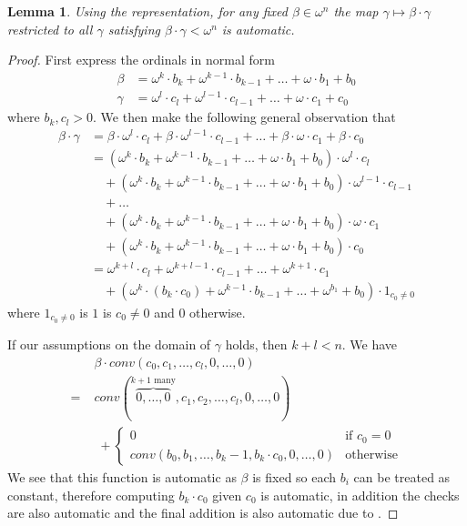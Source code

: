 \documentclass[british,a4paper,11pt,abstract=on]{scrreprt}
\newtheorem{lemma}[theorem]{Lemma}
\theoremstyle{definition}
\theoremstyle{remark}
\begin{document}
\begin{lemma}
    Using the representation, for any fixed \(\beta\in\omega^n\) the map \(\gamma \mapsto \beta\cdot\gamma\)
    restricted to all \(\gamma\) satisfying \(\beta\cdot\gamma < \omega^n\) is automatic.
\end{lemma}
\begin{proof}
    First express the ordinals in normal form
    \begin{align*}
        \beta  &= \omega^k\cdot b_k + \omega^{k-1}\cdot b_{k-1} + \dots + \omega\cdot b_1 + b_0 \\
        \gamma &= \omega^l\cdot c_l + \omega^{l-1}\cdot c_{l-1} + \dots + \omega\cdot c_1 + c_0
    \end{align*}
    where \(b_k, c_l > 0\). We then make the following general observation that
    \begin{align*}
        \beta\cdot\gamma &= \beta\cdot\omega^l\cdot c_l + \beta\cdot\omega^{l-1}\cdot c_{l-1} + \dots + \beta\cdot\omega\cdot c_1 + \beta\cdot c_0 \\
        &= \left( \omega^k\cdot b_k + \omega^{k-1}\cdot b_{k-1} + \dots + \omega\cdot b_1 + b_0 \right)\cdot\omega^l\cdot c_l \\
        &\quad + \left( \omega^k\cdot b_k + \omega^{k-1}\cdot b_{k-1} + \dots + \omega\cdot b_1 + b_0 \right)\cdot\omega^{l-1}\cdot c_{l-1} \\
        &\quad + \dots\\
        &\quad + \left( \omega^k\cdot b_k + \omega^{k-1}\cdot b_{k-1} + \dots + \omega\cdot b_1 + b_0 \right)\cdot\omega\cdot c_1 \\
        &\quad + \left( \omega^k\cdot b_k + \omega^{k-1}\cdot b_{k-1} + \dots + \omega\cdot b_1 + b_0 \right)\cdot c_0 \\
        &= \omega^{k+l}\cdot c_l + \omega^{k+l-1}\cdot c_{l-1} + \dots + \omega^{k+1}\cdot c_1 \\
        &\quad + \left(\omega^k\cdot (b_k\cdot c_0) + \omega^{k-1}\cdot b_{k-1} + \dots + \omega^{b_1} + b_0\right)\cdot 1_{c_0 \ne 0}
    \end{align*}
    where \(1_{c_0 \ne 0}\) is \(1\) is \(c_0 \ne 0\) and \(0\) otherwise.

    If our assumptions on the domain of \(\gamma\) holds, then \(k+l < n\). We have
    \begin{align*}
         &\beta\cdot conv(c_0,c_1,\dots,c_l,0,\dots,0) \\
        =\; &conv(\overbrace{0,\dots,0}^{k+1\text{ many}}, c_1, c_2, \dots, c_l, 0, \dots, 0) \\
        &\; + \begin{cases}
            0 &\text{if } c_0 = 0 \\
            conv(b_0,b_1,\dots,b_k-1,b_k\cdot c_0,0,\dots,0) &\text{otherwise}
        \end{cases}
    \end{align*}
    We see that this function is automatic as \(\beta\) is fixed so each \(b_i\) can be treated as constant,
    therefore computing \(b_k\cdot c_0\) given \(c_0\) is automatic, in addition the checks are also automatic and
    the final addition is also automatic due to .
\end{proof}
\end{document}
